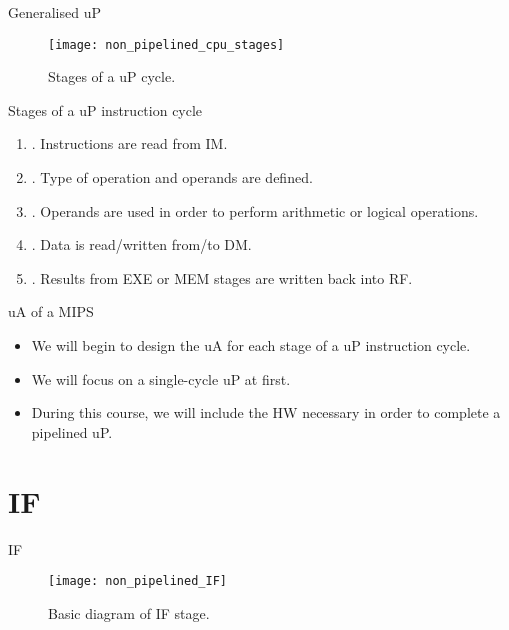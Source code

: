 % 
\begin{frame}{Generalised \ac{uP}}
  \begin{figure}
  \centering
  \texttt{[image: non\_pipelined\_cpu\_stages]}
  \caption{Stages of a \ac{uP} cycle.}
  \label{Figure:non_pipelined_cpu_stages}
  \end{figure}
\end{frame}


% 
\begin{frame}{Stages of a \ac{uP} instruction cycle}
\begin{enumerate}
\item {}. Instructions are read from \ac{IM}.
\item {}. Type of operation and operands are defined.
\item {}. Operands are used in order to perform arithmetic or logical operations.
\item {}. Data is read/written from/to \ac{DM}.
\item {}. Results from \ac{EXE} or \ac{MEM} stages are written back into \ac{RF}.
\end{enumerate}
\end{frame}

% 
\begin{frame}{\ac{uA} of a \ac{MIPS}}
\begin{itemize}
\item We will begin to design the \acf{uA} for each stage of a \ac{uP} instruction cycle.
\item We will focus on a single-cycle \ac{uP} at first.
\item During this course, we will include the \ac{HW} necessary in order to complete a pipelined \ac{uP}. 
\end{itemize}
\end{frame}

\section{\acl{IF}}
% 
\begin{frame}{\acl{IF}}
  \begin{figure}
  \centering
  \texttt{[image: non\_pipelined\_IF]}
  \caption{Basic diagram of \ac{IF} stage.}
  \label{Figure:non_pipelined_IF}
  \end{figure}
\end{frame}

